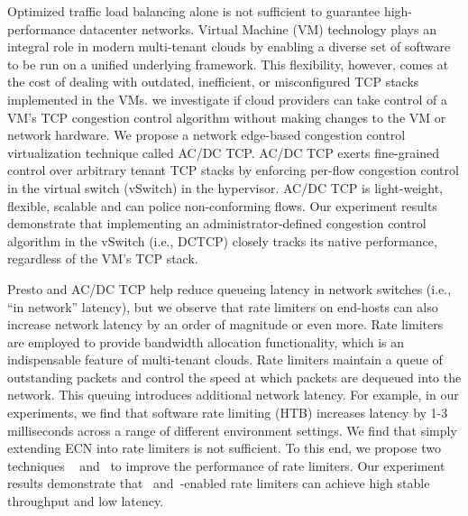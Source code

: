 Optimized traffic load balancing alone is not sufficient to 
guarantee high-performance datacenter networks. 
Virtual Machine (VM) technology plays an integral role in
modern multi-tenant clouds by enabling a diverse set of software to be run
on a unified underlying framework. This flexibility, however,
comes at the cost of dealing with outdated, inefficient,
or misconfigured TCP stacks implemented in the VMs. we
 investigate if cloud providers can take control of a VM's
TCP congestion control algorithm without making changes
to the VM or network hardware. We propose a network edge-based 
 congestion control virtualization technique called AC/DC TCP.
AC/DC TCP exerts fine-grained control over arbitrary tenant
TCP stacks by enforcing per-flow congestion control in
the virtual switch (vSwitch) in the hypervisor. AC/DC TCP is light-weight,
flexible, scalable and can police non-conforming flows. Our experiment results demonstrate that 
implementing an administrator-defined congestion control algorithm in the
vSwitch (i.e., DCTCP) closely tracks its native performance,
regardless of the VM's TCP stack.

Presto and AC/DC TCP help reduce queueing latency in 
network switches (i.e., ``in network'' latency), but we observe that 
rate limiters on end-hosts can also increase network latency by an order of magnitude or even more. 
Rate limiters are employed to provide bandwidth allocation functionality, 
which is an indispensable feature of multi-tenant clouds. Rate limiters
maintain a queue of outstanding packets and control the speed at which
packets are dequeued into the network. This queuing introduces
additional network latency. For example, in our experiments, we find
that software rate limiting (HTB) increases latency by 1-3 milliseconds
across a range of different environment settings. 
We find that simply extending ECN into rate limiters is not sufficient. 
To this end, we propose two techniques \textemdash\xspace~\dem{} and~\spring{} to 
improve the performance of rate limiters.
Our experiment results demonstrate that~\dem{} and~\spring{}-enabled
rate limiters can achieve high stable throughput and low latency.





